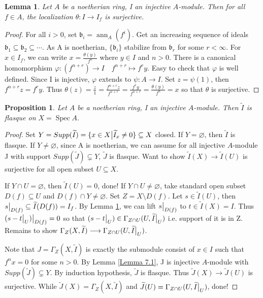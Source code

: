 \documentclass{ctexart}
\newtheorem{proposition}{Proposition}[section]
\newtheorem{lemma}{Lemma}[section]
\newcommand{\spec}{\operatorname{Spec}}
\newcommand{\annihilator}{\operatorname{ann}}
\begin{document}
\begin{lemma}
    Let $A$ be a noetherian ring, I an injective $A$-module.
    Then for all $f\in A$, the localization $\theta: I \longrightarrow I_{f}$ is surjective.
    \label{Lemma 7.2}
\end{lemma}
\begin{proof}
    For all $i > 0$, set $\mathfrak{b}_{i} = \annihilator_{A}(f^{i})$.
    Get an increasing sequence of ideals $\mathfrak{b}_{1} \subseteq \mathfrak{b}_{2} \subseteq \cdots$.
    As A is noetherian, $\{\mathfrak{b}_{i}\}$ stabilize from $\mathfrak{b}_{r}$ for some $r < \infty$.
    For $x\in I_{f}$, we can write $x = \frac{\theta(y)}{f^{n}}$ where $y\in I$ and $n > 0$.
    There is a canonical homomorphism $\varphi: (f^{n + r}) \longrightarrow I\quad f^{n + r} \longmapsto f^{r}y$.
    Easy to check that $\varphi$ is well defined.
    Since I is injective, $\varphi$ extends to $\psi: A \longrightarrow I$.
    Set $z = \psi(1)$, then $f^{n + r}z = f^{r}y$.
    Thus $\theta(z) = \frac{z}{1} = \frac{f^{n + r}z}{f^{n + r}} = \frac{f^{r}y}{f^{n + r}} = \frac{\theta(y)}{f^{n}} = x$ so that $\theta$ is surjective.
\end{proof}
\begin{proposition}
    Let $A$ be a noetherian ring, I an injective $A$-module.
    Then $\widetilde{I}$ is flasque on $X = \spec A$.
    \label{Proposition 7.6}
\end{proposition}
\begin{proof}
    Set $Y = Supp(\widetilde{I}) = \{x\in X \big{|} \widetilde{I}_{x} \neq 0\} \subseteq X$ closed.
    If $Y = \varnothing$, then $\widetilde{I}$ is flasque.
    If $Y \neq \varnothing$, since A is noetherian, we can assume for all injective $A$-module J with support $Supp(\widetilde{J}) \subsetneq Y$, $\widetilde{J}$ is flasque.
    Want to show $\widetilde{I}(X) \longrightarrow \widetilde{I}(U)$ is surjective for all open subset $U \subseteq X$.
    \par
    If $Y \cap U = \varnothing$, then $\widetilde{I}(U) = 0$, done!
    If $Y \cap U \neq \varnothing$, take standard open subset $D(f) \subseteq U$ and $D(f) \cap Y \neq \varnothing$.
    Set $Z = X \setminus D(f)$.
    Let $s\in \widetilde{I}(U)$, then $s\big{|}_{D(f)} \subseteq \widetilde{I}(D(f)) = I_{f}$.
    By Lemma \ref{Lemma 7.2}, we can lift $s\big{|}_{D(f)}$ to $t\in \widetilde{I}(X) = I$.
    Thus $(s - t\big{|}_{U})\big{|}_{D(f)} = 0$ so that $(s - t\big{|}_{U})\in \Gamma_{Z \cap U}(U, \widetilde{I}\big{|}_{U})$ i.e. support of it is in Z.
    Remains to show $\Gamma_{Z}(X, \widetilde{I}) \longrightarrow \Gamma_{Z \cap U}(U, \widetilde{I}\big{|}_{U})$.
    \par
    Note that $J = \Gamma_{Z}(X, \widetilde{I})$ is exactly the submodule consist of $x\in I$ such that $f^{n}x = 0$ for some $n > 0$.
    By Lemma \ref{Lemma 7.1}, J is injective $A$-module with $Supp(\widetilde{J}) \subsetneq Y$.
    By induction hypothesis, $\widetilde{J}$ is flasque.
    Thus $\widetilde{J}(X) \longrightarrow \widetilde{J}(U)$ is surjective.
    While $\widetilde{J}(X) = \Gamma_{Z}(X, \widetilde{I})$ and $\widetilde{J}(U) = \Gamma_{Z \cap U}(U, \widetilde{I}\big{|}_{U})$, done!
\end{proof}
\end{document}
